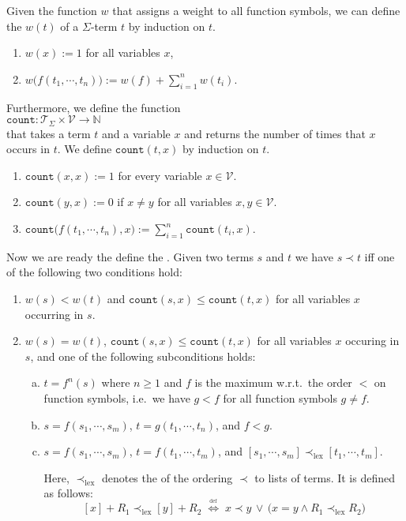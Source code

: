 Given the function $w$ that assigns a weight to all function symbols, we can define the  $w(t)$ of a
$\Sigma$-term $t$ by induction on $t$.
\begin{enumerate}
\item $w(x) := 1$ for all variables $x$,
\item $w\bigl(f(t_1,\cdots,t_n)\bigr) := w(f) + \sum\limits_{i=1}^n w(t_i)$.
\end{enumerate}
Furthermore, we define the function
\\[0.2cm]
\hspace*{1.3cm}
$\texttt{count}: \mathcal{T}_\Sigma \times \mathcal{V} \rightarrow \mathbb{N}$
\\[0.2cm]
that takes a term $t$ and a variable $x$ and returns the number of times that $x$ occurs in $t$.
We define $\texttt{count}(t,x)$ by induction on $t$.
\begin{enumerate}
\item $\texttt{count}(x, x) := 1$ for every variable $x \in \mathcal{V}$.
\item $\texttt{count}(y, x) := 0$ if $x \not= y$ for all variables $x,y \in \mathcal{V}$.
\item $\texttt{count}\bigl(f(t_1,\cdots,t_n), x\bigr) := \sum\limits_{i=1}^n \texttt{count}(t_i, x)$.
\end{enumerate}
Now we are ready the define the .  Given two terms $s$ and $t$  
we have $s \prec t$ iff one of the following two conditions hold:
\begin{enumerate}
\item $w(s) < w(t)$ and $\texttt{count}(s, x) \leq \texttt{count}(t, x)$
       for all variables $x$ occurring in  $s$.
\item $w(s) = w(t)$, $\texttt{count}(s, x) \leq \texttt{count}(t, x)$ for all variables $x$ occuring in $s$, and
      one of the following subconditions holds:
      \begin{enumerate}[(a)]
      \item $t = f^n(s)$ where $n \geq 1$ and $f$ is the maximum w.r.t.~the order $<$ on function symbols,
             i.e.~we have $g < f$ for all function symbols $g \not= f$.
      \item $s = f(s_1,\cdots,s_m)$, $t=g(t_1,\cdots,t_n)$, and $f<g$.
      \item $s = f(s_1,\cdots,s_m)$, $t=f(t_1,\cdots,t_m)$, and $[s_1,\cdots,s_m] \prec_{\textrm{lex}} [t_1,\cdots,t_m]$.
     
            Here, $\prec_{\textrm{lex}}$ denotes the  of the ordering $\prec$ to
            lists of terms.  It is defined as follows:
            $$ [x] + R_1 \prec_{\textrm{lex}} [y] + R_2 \;\stackrel{_\textrm{def}}{\Longleftrightarrow}\;
                 x \prec y \,\vee\, \bigl(x = y \wedge R_1 \prec_{\textrm{lex}} R_2\bigr)
            $$
     \end{enumerate}
\end{enumerate}

